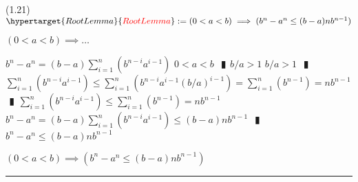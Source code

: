 \documentclass{book}
\newcommand{\df}[1]{\hypertarget{#1}{\textcolor{red}{#1}}}
\newcommand{\abr}{:=}
\newcommand{\pipe}{$\phantom{(}\vrectangleblack\phantom{)}$}
\begin{document}
(1.21) \\
$\df{RootLemma} \abr (0 < a < b) \implies (b^n - a^n \leq (b - a) n b^{n - 1})$
\begin{enumerate}
  \lit $(0 < a < b) \implies \ldots$
  \begin{enumerate}
    \lit $b^n - a^n = (b - a) \sum_{i = 1}^{n}(b^{n - i} a^{i - 1})$
    \lit $0 < a < b$ \pipe $b / a > 1$
    \lit $b / a > 1$ \pipe $\sum_{i = 1}^{n}(b^{n - i} a^{i - 1}) \leq \sum_{i = 1}^{n}(b^{n - i} a^{i - 1} (b / a)^{i - 1}) = \sum_{i = 1}^{n}(b^{n - 1}) = n b^{n - 1}$ \pipe $\sum_{i = 1}^{n}(b^{n - i} a^{i - 1}) \leq \sum_{i = 1}^{n}(b^{n - 1}) = n b^{n - 1}$
    \lit $b^n - a^n = (b - a) \sum_{i = 1}^{n}(b^{n - i} a^{i - 1}) \leq (b - a) n b^{n - 1}$ \pipe $b^n - a^n \leq (b - a) n b^{n - 1}$
  \end{enumerate}
  \lit $(0 < a < b) \implies (b^n - a^n \leq (b - a) n b^{n - 1})$
\end{enumerate} \vspace{.75mm} \hrule \vspace{.75mm} \ \\ 
\end{document}
